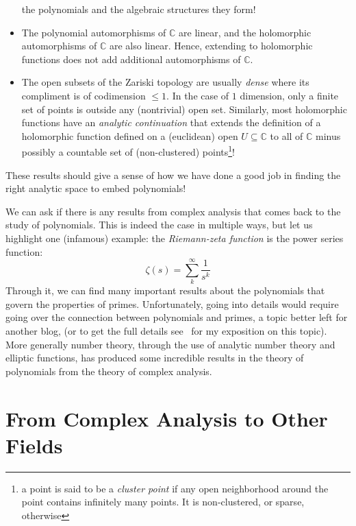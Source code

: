 \documentclass[oneside]{article}
\newcommand{\C}{\mathbb{C}}
\newcommand{\sse}{\subseteq}
\begin{document}
\begin{itemize}
      the polynomials and the algebraic structures they form!
  \item The polynomial automorphisms of $\C$ are linear, and the holomorphic automorphisms of $\C$ are also
    linear. Hence, extending to holomorphic functions does not add additional automorphisms of $\C$.
  \item The open subsets of the Zariski topology are usually \emph{dense} where its compliment is of
    codimension $\le 1$. In the case of $1$ dimension, only a finite set of points is outside any
    (nontrivial) open set. Similarly, most holomorphic functions have an \emph{analytic continuation} that
    extends the definition of a holomorphic function defined on a (euclidean) open $U \sse \C$ to all of $\C$ minus possibly a
    countable set of (non-clustered) points\footnote{a point is said to be a \emph{cluster point} if any
      open neighborhood around the point contains infinitely many points. It is non-clustered, or sparse,
    otherwise}!
\end{itemize}

These results should give a sense of how we have done a good job in finding the right analytic space to
embed polynomials!

We can ask if there is any results from complex analysis that comes back to the
study of polynomials. This is indeed the case in multiple ways, but let us highlight one (infamous) example: the
\emph{Riemann-zeta function} is the power series function:
\[
  \zeta(s) = \sum_k^\infty \frac{1}{s^k}
\]
Through it, we can find many important results about the polynomials that govern the properties of primes.
Unfortunately, going into details would require going over the connection between polynomials and primes,
a topic better left for another blog, (or to get the full details
see~\cite[chapter~3]{nathanaelchwojko-srawleyEverythingYouNeed} for my exposition on this topic). More
generally number theory, through the use of analytic number theory and elliptic functions, has produced some
incredible results in the theory of polynomials from the theory of complex analysis.



\section{From Complex Analysis to Other Fields}
\end{document}
